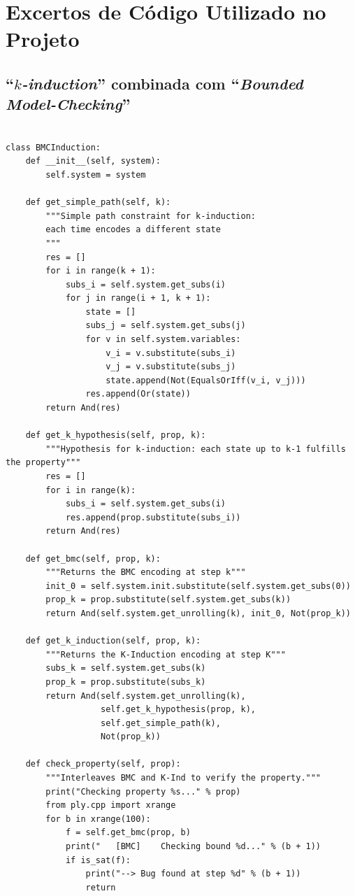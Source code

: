 \documentclass[11pt,a4paper]{report}%
\newenvironment{code}{\captionsetup{type=listing}}{}
\def\bmc{``\textit{Bounded Model-Checking}''\xspace}
\def\kind{``\textit{$k$-induction}''\xspace}
\begin{document}
\appendix %
\chapter{Excertos de Código Utilizado no Projeto} \label{apndx:samples}

\section{\kind combinada com \bmc}

\begin{code}
\begin{verbatim}

class BMCInduction:
    def __init__(self, system):
        self.system = system

    def get_simple_path(self, k):
        """Simple path constraint for k-induction:
        each time encodes a different state
        """
        res = []
        for i in range(k + 1):
            subs_i = self.system.get_subs(i)
            for j in range(i + 1, k + 1):
                state = []
                subs_j = self.system.get_subs(j)
                for v in self.system.variables:
                    v_i = v.substitute(subs_i)
                    v_j = v.substitute(subs_j)
                    state.append(Not(EqualsOrIff(v_i, v_j)))
                res.append(Or(state))
        return And(res)

    def get_k_hypothesis(self, prop, k):
        """Hypothesis for k-induction: each state up to k-1 fulfills the property"""
        res = []
        for i in range(k):
            subs_i = self.system.get_subs(i)
            res.append(prop.substitute(subs_i))
        return And(res)

    def get_bmc(self, prop, k):
        """Returns the BMC encoding at step k"""
        init_0 = self.system.init.substitute(self.system.get_subs(0))
        prop_k = prop.substitute(self.system.get_subs(k))
        return And(self.system.get_unrolling(k), init_0, Not(prop_k))

    def get_k_induction(self, prop, k):
        """Returns the K-Induction encoding at step K"""
        subs_k = self.system.get_subs(k)
        prop_k = prop.substitute(subs_k)
        return And(self.system.get_unrolling(k),
                   self.get_k_hypothesis(prop, k),
                   self.get_simple_path(k),
                   Not(prop_k))

    def check_property(self, prop):
        """Interleaves BMC and K-Ind to verify the property."""
        print("Checking property %s..." % prop)
        from ply.cpp import xrange
        for b in xrange(100):
            f = self.get_bmc(prop, b)
            print("   [BMC]    Checking bound %d..." % (b + 1))
            if is_sat(f):
                print("--> Bug found at step %d" % (b + 1))
                return


\end{verbatim}
\end{code}
\end{document}
